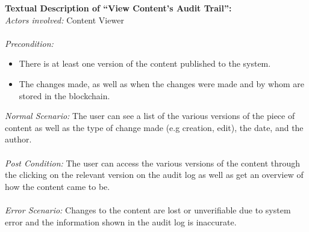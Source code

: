 \newpage
\noindent
\textbf{Textual Description of “View Content's Audit Trail”:} \\
\textit{Actors involved:} Content Viewer \\ \\
\textit{Precondition:} 
	\begin{itemize}
		\item There is at least one version of the content published to the system.
		\item The changes made, as well as when the changes were made and by whom are stored in the blockchain.
	\end{itemize}
\textit{Normal Scenario:} The user can see a list of the various versions of the 
						  piece of content as well as the type of change made 
						  (e.g creation, edit), the date, and the author. \\ \\
\textit{Post Condition:} The user can access the various versions of the content through 
						 the clicking on the relevant version on the audit log as well as 
						 get an overview of how the content came to be. \\ \\
\textit{Error Scenario:} Changes to the content are lost or unverifiable due to system error 
						 and the information shown in the audit log is inaccurate. \\ \\
\newpage
